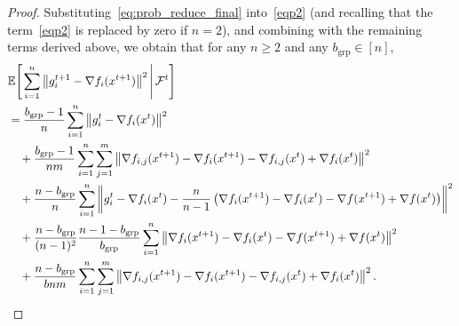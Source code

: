 \documentclass{article}
\newcommand{\sqn}[1]{\left\| #1 \right\|^2}
\newcommand{\Expb}[2]{\mathbb{E}\!\left[\left. #1\,\right|#2 \right]}
\newcommand{\Expc}[1]{\Expb{#1}{\mathcal{F}^t}}
\theoremstyle{plain}
\begin{document}
\begin{proof}
Substituting~\eqref{eq:prob_reduce_final} into~\eqref{eqp2} (and recalling that the term~\eqref{eqp2} is replaced by zero if $n=2$),
and combining with the remaining terms derived above, we obtain that for any $n\geq 2$ and any $b_{\mathrm{grp}}\in[n]$,
\begin{align*}
&\Expc{\sum_{i=1}^n \sqn{g_i^{t+1}-\nabla f_i(x^{t+1})}}\\
&=\frac{b_{\mathrm{grp}}-1}{n} \sum_{i=1}^n\sqn{g_i^t - \nabla f_i(x^{t})}\\
&\quad+\frac{b_{\mathrm{grp}}-1}{nm}\sum_{i=1}^n\sum_{j=1}^m
\sqn{\nabla f_{i,j}(x^{t+1})-\nabla f_i(x^{t+1})-\nabla f_{i,j}(x^{t})+\nabla f_i(x^{t})}\\
&\quad+\frac{n-b_{\mathrm{grp}}}{n}
\sum_{i=1}^n\left\| g_i^{t}-\nabla f_i(x^{t})- \frac{n}{n-1}\left(\nabla f_{i}(x^{t+1})-\nabla f_{i}(x^{t})-\nabla f(x^{t+1})+\nabla f(x^{t}) \right) \right\|^2\\
&\quad+\frac{n-b_{\mathrm{grp}}}{(n-1)^2}\frac{n-1-b_{\mathrm{grp}}}{b_{\mathrm{grp}}}\sum_{i=1}^n
\sqn{\nabla f_{i}(x^{t+1})-\nabla f_{i}(x^{t})-\nabla f(x^{t+1})+\nabla f(x^{t})}\\
&\quad+\frac{n-b_{\mathrm{grp}}}{bnm}\sum_{i=1}^n\sum_{j=1}^m
\sqn{\nabla f_{i,j}(x^{t+1})- \nabla f_{i}(x^{t+1})-\nabla f_{i,j}(x^{t})+\nabla f_{i}(x^{t})}.\notag
\end{align*}



\end{proof}
\end{document}
